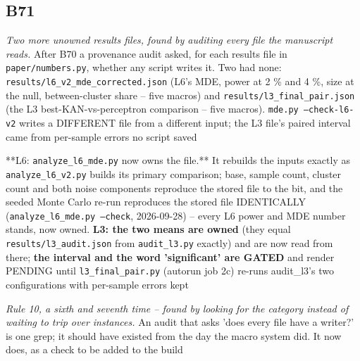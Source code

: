 \documentclass[10pt]{article}
\begin{document}
\subsection*{B71}\label{led:B71}
\begin{description}[leftmargin=0pt,itemsep=1pt]
\item[Defect.] \emph{Two more unowned results files, found by auditing every file the manuscript reads.} After B70 a provenance audit asked, for each results file in \texttt{paper/numbers.py}, whether any script writes it. Two had none: \texttt{results/l6\_v2\_mde\_corrected.json} (L6's MDE, power at 2 \% and 4 \%, size at the null, between-cluster share -- five macros) and \texttt{results/l3\_final\_pair.json} (the L3 best-KAN-vs-perceptron comparison -- five macros). \texttt{mde.py --check-l6-v2} writes a DIFFERENT file from a different input; the L3 file's paired interval came from per-sample errors no script saved
\item[Resolution.] **L6: \texttt{analyze\_l6\_mde.py} now owns the file.** It rebuilds the inputs exactly as \texttt{analyze\_l6\_v2.py} builds its primary comparison; base, sample count, cluster count and both noise components reproduce the stored file to the bit, and the seeded Monte Carlo re-run reproduces the stored file IDENTICALLY (\texttt{analyze\_l6\_mde.py --check}, 2026-09-28) -- every L6 power and MDE number stands, now owned. \textbf{L3: the two means are owned} (they equal \texttt{results/l3\_audit.json} from \texttt{audit\_l3.py} exactly) and are now read from there; \textbf{the interval and the word 'significant' are GATED} and render PENDING until \texttt{l3\_final\_pair.py} (autorun job 2c) re-runs audit\_l3's two configurations with per-sample errors kept
\item[Note.] \emph{Rule 10, a sixth and seventh time -- found by looking for the category instead of waiting to trip over instances.} An audit that asks 'does every file have a writer?' is one grep; it should have existed from the day the macro system did. It now does, as a check to be added to the build
\end{description}
\end{document}
